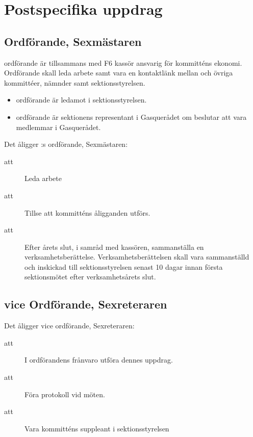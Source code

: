 \section{Postspecifika uppdrag}

\subsection{Ordförande, Sexmästaren}
\forening ordförande är tillsammans med F6 kassör ansvarig för kommitténs ekonomi. Ordförande skall leda \forening arbete samt vara en kontaktlänk mellan \forening och övriga kommittéer, nämnder samt sektionsstyrelsen. 



\begin{itemize}

\item \forening ordförande är ledamot i sektionsstyrelsen.

\item \forening ordförande är sektionens representant i Gasquerådet om \forening beslutar att vara medlemmar i Gasquerådet.

\end{itemize}


Det åligger \forening :s ordförande, Sexmästaren:
\begin{description}

\item[att] Leda \forening arbete

\item[att] Tillse att kommitténs åligganden utförs.

\item[att] Efter årets slut, i samråd med kassören, sammanställa en verksamhetsberättelse. Verksamhetsberättelsen skall vara sammanställd och inskickad till sektionsstyrelsen senast 10 dagar innan första sektionsmötet efter verksamhetsårets slut.

\end{description}

\subsection{vice Ordförande, Sexreteraren}
Det åligger \forening vice ordförande, Sexreteraren:
\begin{description}
\item[att] I ordförandens frånvaro utföra dennes uppdrag.

\item[att] Föra protokoll vid \forening möten.

\item[att] Vara kommitténs suppleant i sektionsstyrelsen

\end{description}



